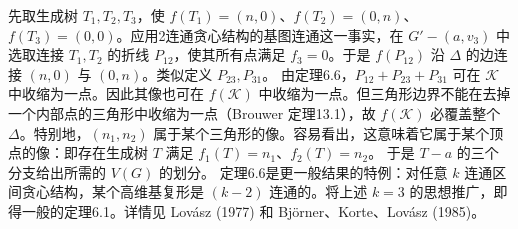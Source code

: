 先取生成树 $T_1,T_2,T_3$，使 $f(T_1)=(n,0)$、$f(T_2)=(0,n)$、$f(T_3)=(0,0)$。应用2连通贪心结构的基图连通这一事实，在 $G'-(a,v_3)$ 中选取连接 $T_1,T_2$ 的折线 $P_{12}$，使其所有点满足 $f_3=0$。于是 $f(P_{12})$ 沿 $\Delta$ 的边连接 $(n,0)$ 与 $(0,n)$。类似定义 $P_{23},P_{31}$。
由定理6.6，$P_{12}+P_{23}+P_{31}$ 可在 $\mathcal K$ 中收缩为一点。因此其像也可在 $f(\mathcal K)$ 中收缩为一点。但三角形边界不能在去掉一个内部点的三角形中收缩为一点（Brouwer 定理13.1），故 $f(\mathcal K)$ 必覆盖整个 $\Delta$。特别地，$(n_1,n_2)$ 属于某个三角形的像。容易看出，这意味着它属于某个顶点的像：即存在生成树 $T$ 满足 $f_1(T)=n_1$、$f_2(T)=n_2$。
于是 $T-a$ 的三个分支给出所需的 $V(G)$ 的划分。
定理6.6是更一般结果的特例：对任意 $k$ 连通区间贪心结构，某个高维基复形是 $(k-2)$ 连通的。将上述 $k=3$ 的思想推广，即得一般的定理6.1。详情见 Lovász (1977) 和 Björner、Korte、Lovász (1985)。
